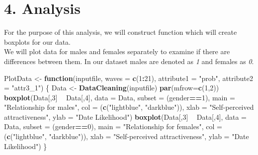 \documentclass[]{article}
\newenvironment{Shaded}{\begin{snugshade}}{\end{snugshade}}
\newcommand{\ControlFlowTok}[1]{\textcolor[rgb]{0.13,0.29,0.53}{\textbf{#1}}}
\newcommand{\DataTypeTok}[1]{\textcolor[rgb]{0.13,0.29,0.53}{#1}}
\newcommand{\DecValTok}[1]{\textcolor[rgb]{0.00,0.00,0.81}{#1}}
\newcommand{\KeywordTok}[1]{\textcolor[rgb]{0.13,0.29,0.53}{\textbf{#1}}}
\newcommand{\NormalTok}[1]{#1}
\newcommand{\OperatorTok}[1]{\textcolor[rgb]{0.81,0.36,0.00}{\textbf{#1}}}
\newcommand{\StringTok}[1]{\textcolor[rgb]{0.31,0.60,0.02}{#1}}
\begin{document}
\hypertarget{analysis}{%
\section{4. Analysis}\label{analysis}}

For the purpose of this analysis, we will construct function which will
create boxplots for our data.\\
We will plot data for males and females separately to examine if there
are differences between them. In our dataset males are denoted as
\emph{1} and females as \emph{0}.

\begin{Shaded}
\begin{Highlighting}[]
\NormalTok{PlotData <-}\StringTok{ }\ControlFlowTok{function}\NormalTok{(inputfile, }\DataTypeTok{waves =} \KeywordTok{c}\NormalTok{(}\DecValTok{1}\OperatorTok{:}\DecValTok{21}\NormalTok{),}
                     \DataTypeTok{attribute1 =} \StringTok{"prob"}\NormalTok{, }\DataTypeTok{attribute2 =} \StringTok{"attr3_1"}\NormalTok{)}
\NormalTok{\{}
\NormalTok{  Data <-}\StringTok{ }\KeywordTok{DataCleaning}\NormalTok{(inputfile)}
  \KeywordTok{par}\NormalTok{(}\DataTypeTok{mfrow=}\KeywordTok{c}\NormalTok{(}\DecValTok{1}\NormalTok{,}\DecValTok{2}\NormalTok{))}
  \KeywordTok{boxplot}\NormalTok{(Data[,}\DecValTok{3}\NormalTok{] }\OperatorTok{~}\StringTok{ }\NormalTok{Data[,}\DecValTok{4}\NormalTok{], }\DataTypeTok{data =}\NormalTok{ Data, }\DataTypeTok{subset =}\NormalTok{ (gender}\OperatorTok{==}\DecValTok{1}\NormalTok{),}
          \DataTypeTok{main =} \StringTok{"Relationship for males"}\NormalTok{, }\DataTypeTok{col =}\NormalTok{ (}\KeywordTok{c}\NormalTok{(}\StringTok{"lightblue"}\NormalTok{, }\StringTok{"darkblue"}\NormalTok{)),}
          \DataTypeTok{xlab =} \StringTok{"Self-perceived attractiveness"}\NormalTok{, }\DataTypeTok{ylab =} \StringTok{"Date Likelihood"}\NormalTok{)}
  \KeywordTok{boxplot}\NormalTok{(Data[,}\DecValTok{3}\NormalTok{] }\OperatorTok{~}\StringTok{ }\NormalTok{Data[,}\DecValTok{4}\NormalTok{], }\DataTypeTok{data =}\NormalTok{ Data, }\DataTypeTok{subset =}\NormalTok{ (gender}\OperatorTok{==}\DecValTok{0}\NormalTok{),}
          \DataTypeTok{main =} \StringTok{"Relationship for females"}\NormalTok{, }\DataTypeTok{col =}\NormalTok{ (}\KeywordTok{c}\NormalTok{(}\StringTok{"lightblue"}\NormalTok{, }\StringTok{"darkblue"}\NormalTok{)),}
          \DataTypeTok{xlab =} \StringTok{"Self-perceived attractiveness"}\NormalTok{, }\DataTypeTok{ylab =} \StringTok{"Date Likelihood"}\NormalTok{)}
\NormalTok{\}}
\end{Highlighting}
\end{Shaded}
\end{document}
